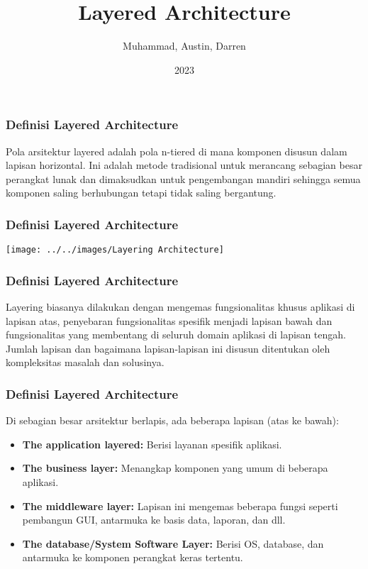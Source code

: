\documentclass{beamer}
\title{Layered Architecture}
\author{Muhammad, Austin, Darren}
\institute{Pradita University}
\date{2023}
\begin{document}
\frame{\titlepage}

\begin{frame}
	\frametitle{Definisi Layered Architecture}
	Pola arsitektur layered adalah pola n-tiered di mana komponen disusun dalam lapisan horizontal. Ini adalah metode tradisional untuk merancang sebagian besar perangkat lunak dan dimaksudkan untuk pengembangan mandiri sehingga semua komponen saling berhubungan tetapi tidak saling bergantung.
\end{frame}

\begin{frame}
	\frametitle{Definisi Layered Architecture}
	\texttt{[image: ../../images/Layering Architecture]}

\end{frame}

\begin{frame}
	\frametitle{Definisi Layered Architecture}
	Layering biasanya dilakukan dengan mengemas fungsionalitas khusus aplikasi di lapisan atas, penyebaran fungsionalitas spesifik menjadi lapisan bawah dan fungsionalitas yang membentang di seluruh domain aplikasi di lapisan tengah. Jumlah lapisan dan bagaimana lapisan-lapisan ini disusun ditentukan oleh kompleksitas masalah dan solusinya.
\end{frame}

\begin{frame}
	\frametitle{Definisi Layered Architecture}
	Di sebagian besar arsitektur berlapis, ada beberapa lapisan (atas ke bawah):
	\begin{itemize}
		\item \textbf{The application layered:} Berisi layanan spesifik aplikasi.
		\item \textbf{The business layer:} Menangkap komponen yang umum di beberapa aplikasi.
		\item \textbf{The middleware layer:} Lapisan ini mengemas beberapa fungsi seperti pembangun GUI, antarmuka ke basis data, laporan, dan dll.
		\item \textbf{The database/System Software Layer:} Berisi OS, database, dan antarmuka ke komponen perangkat keras tertentu.
	\end{itemize}
\end{frame}
\end{document}
